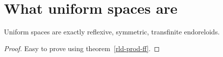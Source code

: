 \section{What uniform spaces are}
\begin{prop}
Uniform spaces are exactly
reflexive, symmetric, transfinite endoreloids.\end{prop}
\begin{proof}
Easy to prove using theorem~\ref{rld-prod-ff}.\end{proof}

